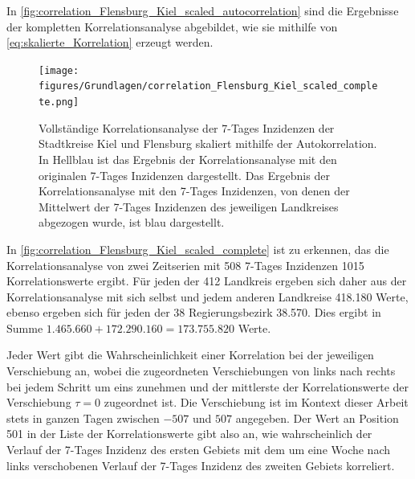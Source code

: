 In \autoref{fig:correlation_Flensburg_Kiel_scaled_autocorrelation} sind die Ergebnisse der kompletten Korrelationsanalyse abgebildet, wie sie mithilfe von \autoref{eq:skalierte_Korrelation} erzeugt werden.
\begin{figure}[H]
    \centering
    \texttt{[image: figures/Grundlagen/correlation\_Flensburg\_Kiel\_scaled\_complete.png]}
    \caption{Vollständige Korrelationsanalyse der 7-Tages Inzidenzen der Stadtkreise Kiel und Flensburg skaliert mithilfe der Autokorrelation.
    In Hellblau ist das Ergebnis der Korrelationsanalyse mit den originalen 7-Tages Inzidenzen dargestellt. Das Ergebnis der Korrelationsanalyse mit den 7-Tages Inzidenzen, von denen der Mittelwert der 7-Tages Inzidenzen des jeweiligen Landkreises abgezogen wurde, ist blau dargestellt.}
    \label{fig:correlation_Flensburg_Kiel_scaled_complete}
\end{figure}

In \autoref{fig:correlation_Flensburg_Kiel_scaled_complete} ist zu erkennen, das die Korrelationsanalyse von zwei Zeitserien mit 508 7-Tages Inzidenzen 1015 Korrelationswerte ergibt.
Für jeden der 412 Landkreis ergeben sich daher aus der Korrelationsanalyse mit sich selbst und jedem anderen Landkreise 418.180 Werte, ebenso ergeben sich für jeden der 38 Regierungsbezirk 38.570. Dies ergibt in Summe $
1.465.660+172.290.160=173.755.820$ Werte.

Jeder Wert gibt die Wahrscheinlichkeit einer Korrelation bei der jeweiligen Verschiebung an, wobei die zugeordneten Verschiebungen von links nach rechts bei jedem Schritt um eins zunehmen und der mittlerste der Korrelationswerte der Verschiebung $\tau = 0$ zugeordnet ist. Die Verschiebung ist im Kontext dieser Arbeit stets in ganzen Tagen zwischen $-507$ und $507$ angegeben. Der Wert an Position 501 in der Liste der Korrelationswerte gibt also an, wie wahrscheinlich der Verlauf der 7-Tages Inzidenz des ersten Gebiets mit dem um eine Woche nach links verschobenen Verlauf der 7-Tages Inzidenz des zweiten Gebiets korreliert.

